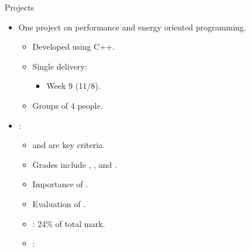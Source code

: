 \begin{frame}[t]{Projects}
\begin{itemize}
  \item One project on performance and energy oriented programming.
    \begin{itemize}
        \item Developed using C++.
        \item Single delivery:
        \begin{itemize}
          \item Week 9 (11/8).
        \end{itemize}
        \item Groups of 4 people.
    \end{itemize}

    \item {}:
      \begin{itemize}
        \item {} and  are key criteria.
        \item Grades include , , 
              and .
        \item Importance of .
        \item Evaluation of .
        \item {}: 24\% of total mark.
        \item {}: 
    \end{itemize}
\end{itemize}
\end{frame}

